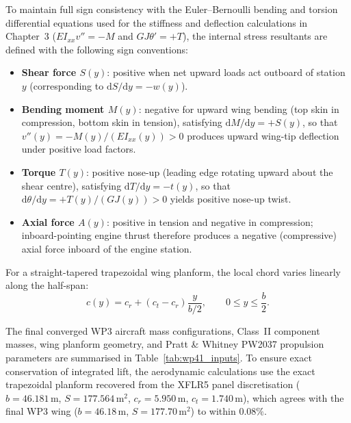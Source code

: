To maintain full sign consistency with the Euler--Bernoulli bending and torsion differential equations used for the stiffness and deflection calculations in Chapter~3 ($E I_{xx} v'' = -M$ and $G J \theta' = +T$), the internal stress resultants are defined with the following sign conventions:
\begin{itemize}
    \item \textbf{Shear force $S(y)$}: positive when net upward loads act outboard of station $y$ (corresponding to $\mathrm{d}S/\mathrm{d}y = -w(y)$).
    \item \textbf{Bending moment $M(y)$}: negative for upward wing bending (top skin in compression, bottom skin in tension), satisfying $\mathrm{d}M/\mathrm{d}y = +S(y)$, so that $v''(y) = -M(y)/(E I_{xx}(y)) > 0$ produces upward wing-tip deflection under positive load factors.
    \item \textbf{Torque $T(y)$}: positive nose-up (leading edge rotating upward about the shear centre), satisfying $\mathrm{d}T/\mathrm{d}y = -t(y)$, so that $\mathrm{d}\theta/\mathrm{d}y = +T(y)/(G J(y)) > 0$ yields positive nose-up twist.
    \item \textbf{Axial force $A(y)$}: positive in tension and negative in compression; inboard-pointing engine thrust therefore produces a negative (compressive) axial force inboard of the engine station.
\end{itemize}

For a straight-tapered trapezoidal wing planform, the local chord varies linearly along the half-span:
\begin{equation}
    c(y) = c_r + (c_t - c_r)\frac{y}{b/2}, \qquad 0 \le y \le \frac{b}{2}.
    \label{eq:chord_dist}
\end{equation}

The final converged WP3 aircraft mass configurations, Class~II component masses, wing planform geometry, and Pratt \& Whitney PW2037 propulsion parameters \cite{wp3} are summarised in Table~\ref{tab:wp41_inputs}. To ensure exact conservation of integrated lift, the aerodynamic calculations use the exact trapezoidal planform recovered from the XFLR5 panel discretisation ($b = 46.181\,\text{m}$, $S = 177.564\,\text{m}^2$, $c_r = 5.950\,\text{m}$, $c_t = 1.740\,\text{m}$), which agrees with the final WP3 wing ($b = 46.18\,\text{m}$, $S = 177.70\,\text{m}^2$) to within $0.08\%$.

